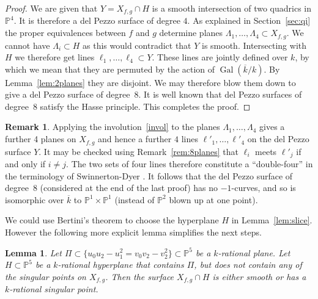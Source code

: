 \documentclass[12pt]{amsart}
\newcommand{\Gal}{{\operatorname{Gal}}}
\newcommand{\PP}{{\mathbb P}}
\newcommand{\kbar}{{\overline k}}
\newtheorem{Lemma}[Proposition]{Lemma}
\theoremstyle{definition}
\newtheorem{Remark}[Proposition]{Remark}
\begin{document}
\begin{proof}
  We are given that $Y = X_{f,g} \cap H$ is a smooth intersection of
  two quadrics in $\PP^4$. It is therefore a del Pezzo surface of
  degree $4$. As explained in Section~\ref{sec:qi} the proper
  equivalences between $f$ and $g$ determine planes
  $\Lambda_1, \ldots, \Lambda_4 \subset X_{f,g}$. We cannot have
  $\Lambda_i \subset H$ as this would contradict that $Y$ is
  smooth. Intersecting with $H$ we therefore get lines
  $\ell_1, \ldots, \ell_4 \subset Y$.  These lines are jointly defined
  over $k$, by which we mean that they are permuted by the action of
  $\Gal(\kbar/k)$.  By Lemma~\ref{lem:2planes} they are disjoint.  We
  may therefore blow them down to give a del Pezzo surface of
  degree~$8$. It is well known that del Pezzo surfaces of degree~$8$
  satisfy the Hasse principle. This completes the proof.
\end{proof}

\begin{Remark} Applying the involution~\eqref{invol} to the planes
  $\Lambda_1, \dots, \Lambda_4$ gives a further 4 planes on $X_{f,g}$
  and hence a further $4$ lines $\ell'_1, \ldots, \ell'_4$ on the del
  Pezzo surface $Y$.  It may be checked using Remark~\ref{rem:8planes}
  that $\ell_i$ meets $\ell'_j$ if and only if $i \not= j$.  The two
  sets of four lines therefore constitute a ``double-four'' in the
  terminology of Swinnerton-Dyer \cite[Section 7]{SD}.  It follows
  that the del Pezzo surface of degree~$8$ (considered at the end of
  the last proof) has no $-1$-curves, and so is isomorphic over
  $\kbar$ to $\PP^1 \times \PP^1$ (instead of $\PP^2$ blown up at one
  point).
\end{Remark}

We could use Bertini's theorem to choose the hyperplane $H$ in
Lemma~\ref{lem:slice}. However the following more explicit lemma
simplifies the next steps.

\begin{Lemma}
  \label{lem:make-smooth}
  Let $\Pi \subset \{ u_0 u_2 - u_1^2 = v_0 v_2 - v_2^2 \} \subset \PP^5$
  be a $k$-rational plane. Let $H \subset \PP^5$ be a $k$-rational
  hyperplane that contains $\Pi$, but does not contain any of the
  singular points on $X_{f,g}$.  Then the surface $X_{f,g} \cap H$
  is either smooth or has a $k$-rational singular point.
\end{Lemma}
\end{document}
